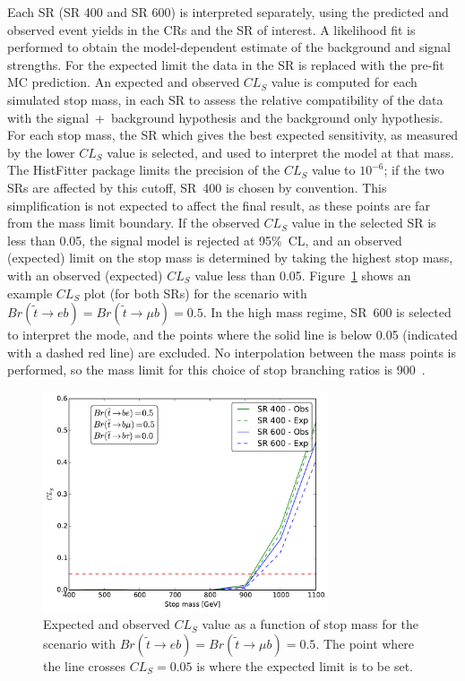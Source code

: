Each SR (SR 400 and SR 600) is interpreted separately, using the predicted and
observed event yields in the CRs and the SR of interest.
A likelihood fit is performed to obtain the model-dependent estimate of the
background and signal strengths.
For the expected limit the data in the SR is replaced with the pre-fit MC
prediction.
An expected and observed $CL_S$ value is computed for each simulated stop mass,
in each SR to assess the relative compatibility of the data with the
signal~+~background hypothesis and the background only hypothesis.
For each stop mass, the SR which gives the best expected sensitivity, as
measured by the lower $CL_S$ value is selected, and used to interpret the model
at that mass.
The HistFitter package limits the precision of the $CL_S$ value to $10^{-6}$;
if the two SRs are affected by this cutoff, SR~400 is chosen by convention.
This simplification is not expected to affect the final result, as these points
are far from the mass limit boundary.
If the observed $CL_S$ value in the selected SR is less than 0.05, the signal
model is rejected at 95\%~CL, and an observed (expected) limit on the stop mass
is determined by taking the highest stop mass, with an observed (expected)
$CL_S$ value less than 0.05.
Figure~\ref{fig:exp_limit_br_5050} shows an example $CL_S$ plot (for both SRs)
for the scenario with $Br(\tilde{t} \to eb) = Br(\tilde{t} \to \mu b) = 0.5$.
In the high mass regime, SR~600 is selected to interpret the mode, and
the points where the solid line is below 0.05 (indicated with a dashed red line)
are excluded.
No interpolation between the mass points is performed, so the mass limit for
this choice of stop branching ratios is 900~\GeV.

\begin{figure}[t]
  \centering
  \includegraphics[width=0.75\textwidth]{figs/blstop/cls_plots/cls_vs_m_br_e_50_br_m_50_br_t_0.pdf}
  \caption{Expected and observed $CL_S$ value as a function of stop mass for
    the scenario with $Br(\tilde{t} \to eb) = Br(\tilde{t} \to \mu b) = 0.5$.
    The point where the line crosses $CL_S=0.05$ is where the expected limit is
    to be set.
  }
  \label{fig:exp_limit_br_5050}
\end{figure}

